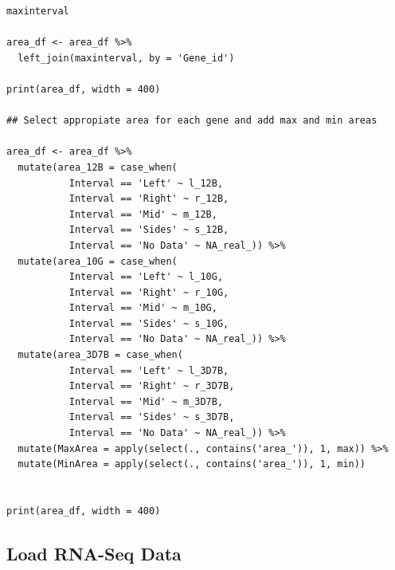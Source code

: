 \documentclass[11pt]{article}
\begin{document}
\begin{verbatim}
maxinterval

area_df <- area_df %>%
  left_join(maxinterval, by = 'Gene_id')

print(area_df, width = 400)

## Select appropiate area for each gene and add max and min areas

area_df <- area_df %>%
  mutate(area_12B = case_when(
           Interval == 'Left' ~ l_12B,
           Interval == 'Right' ~ r_12B,
           Interval == 'Mid' ~ m_12B,
           Interval == 'Sides' ~ s_12B,
           Interval == 'No Data' ~ NA_real_)) %>%
  mutate(area_10G = case_when(
           Interval == 'Left' ~ l_10G,
           Interval == 'Right' ~ r_10G,
           Interval == 'Mid' ~ m_10G,
           Interval == 'Sides' ~ s_10G,
           Interval == 'No Data' ~ NA_real_)) %>%
  mutate(area_3D7B = case_when(
           Interval == 'Left' ~ l_3D7B,
           Interval == 'Right' ~ r_3D7B,
           Interval == 'Mid' ~ m_3D7B,
           Interval == 'Sides' ~ s_3D7B,
           Interval == 'No Data' ~ NA_real_)) %>%
  mutate(MaxArea = apply(select(., contains('area_')), 1, max)) %>%
  mutate(MinArea = apply(select(., contains('area_')), 1, min))


print(area_df, width = 400)
\end{verbatim}
\subsection{Load RNA-Seq Data}
\label{sec:org637246a}
\end{document}
